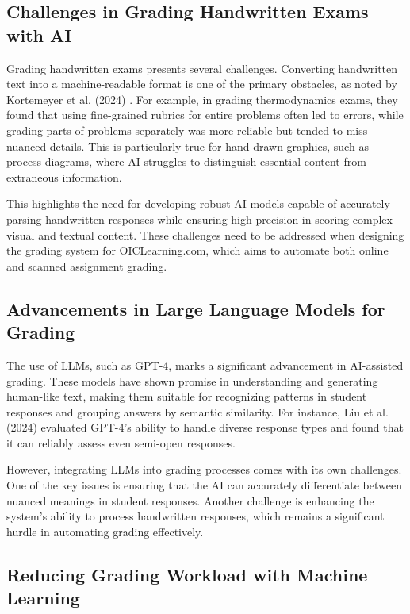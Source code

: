 \documentclass[ms,twoside,print]{nuthesis}
\begin{document}
\subsection{Challenges in Grading Handwritten Exams with AI}

Grading handwritten exams presents several challenges. Converting handwritten text into a machine-readable format is one of the primary obstacles, as noted by Kortemeyer et al. (2024) \cite{Kortemeyer2024}. For example, in grading thermodynamics exams, they found that using fine-grained rubrics for entire problems often led to errors, while grading parts of problems separately was more reliable but tended to miss nuanced details. This is particularly true for hand-drawn graphics, such as process diagrams, where AI struggles to distinguish essential content from extraneous information.

This highlights the need for developing robust AI models capable of accurately parsing handwritten responses while ensuring high precision in scoring complex visual and textual content. These challenges need to be addressed when designing the grading system for OICLearning.com, which aims to automate both online and scanned assignment grading.

\subsection{Advancements in Large Language Models for Grading}

The use of LLMs, such as GPT-4, marks a significant advancement in AI-assisted grading. These models have shown promise in understanding and generating human-like text, making them suitable for recognizing patterns in student responses and grouping answers by semantic similarity. For instance, Liu et al. (2024) \cite{Liu2024} evaluated GPT-4’s ability to handle diverse response types and found that it can reliably assess even semi-open responses.

However, integrating LLMs into grading processes comes with its own challenges. One of the key issues is ensuring that the AI can accurately differentiate between nuanced meanings in student responses. Another challenge is enhancing the system’s ability to process handwritten responses, which remains a significant hurdle in automating grading effectively.

\subsection{Reducing Grading Workload with Machine Learning}
\end{document}
